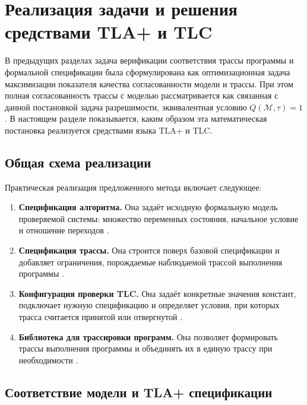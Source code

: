 \section{Реализация задачи и решения средствами TLA+ и TLC}

В предыдущих разделах задача верификации соответствия трассы программы и
формальной спецификации была сформулирована как оптимизационная задача
максимизации показателя качества согласованности модели и трассы. При этом
полная согласованность трассы с моделью рассматривается как связанная с данной
постановкой задача разрешимости, эквивалентная условию $Q(\mathcal{M},\tau)=1$.
В настоящем разделе показывается, каким образом эта математическая постановка
реализуется средствами языка TLA+ и TLC.

\subsection{Общая схема реализации}

Практическая реализация предложенного метода включает следующее:

\begin{enumerate}[leftmargin=0pt,itemindent=4.6em]
    \item \textbf{Спецификация алгоритма.}
    Она задаёт исходную формальную модель проверяемой системы: множество
переменных состояния, начальное условие и отношение переходов
\cite{twophaseimpl}.

    \item \textbf{Спецификация трассы.}
    Она строится поверх базовой спецификации и добавляет ограничения,
порождаемые наблюдаемой трассой выполнения программы \cite{twophaseimpl}.

    \item \textbf{Конфигурация проверки TLC.}
    Она задаёт конкретные значения констант, подключает нужную спецификацию и
определяет условия, при которых трасса считается принятой или отвергнутой
\cite{twophaseimpl}.

    \item \textbf{Библиотека для трассировки программ.}
    Она позволяет формировать трассы выполнения программы и объединять их в
единую трассу при необходимости \cite{tlacimpl}.
\end{enumerate}

\subsection{Соответствие модели и TLA+ спецификации}

